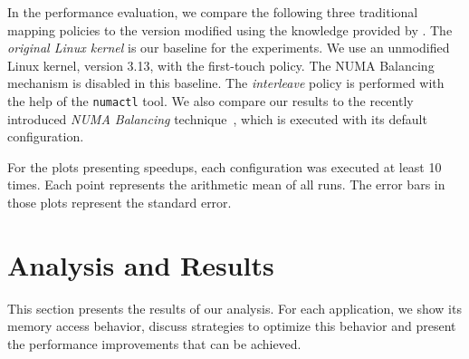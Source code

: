 In the performance evaluation, we compare the following three traditional
mapping policies to the version modified using the knowledge provided by \TABARNAC.
The \emph{original Linux kernel} is our baseline for the experiments. We use an unmodified Linux kernel, version 3.13, with the first-touch policy. The NUMA Balancing mechanism is disabled in this baseline.
The \emph{interleave} policy is performed with the help of the \texttt{numactl} tool.
We also compare our results to the recently introduced \emph{NUMA Balancing} technique~\cite{Corbet}, which is executed with its default configuration.

For the plots presenting speedups, each configuration was executed at least 10 times. Each point represents the arithmetic mean of all runs.
The error bars in those plots represent the standard error.


\section{Analysis and Results}
\label{sec:expe-analysis}

This section presents the results of our analysis.
For each application, we show its memory access behavior, discuss strategies to optimize this behavior and present the performance improvements that can be achieved.






